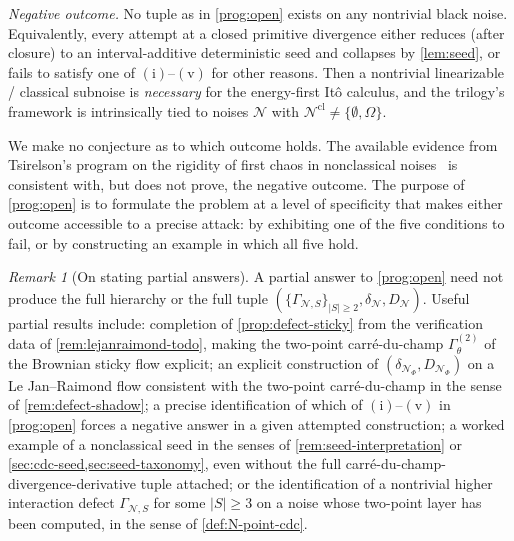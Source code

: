\documentclass[11pt,reqno]{amsart}
\theoremstyle{plain}
\theoremstyle{definition}
\theoremstyle{remark}
\newtheorem{remark}[theorem]{Remark}
\begin{document}
\medskip\noindent
\emph{Negative outcome.} No tuple as in \cref{prog:open} exists on
any nontrivial black noise. Equivalently, every attempt at a closed
primitive divergence either reduces (after closure) to an
interval-additive deterministic seed and collapses by
\cref{lem:seed}, or fails to satisfy one of
$(\mathrm i)$--$(\mathrm v)$ for other reasons. Then a nontrivial
linearizable / classical subnoise is \emph{necessary} for the
energy-first It\^o calculus, and the trilogy's framework is
intrinsically tied to noises $\mathcal N$ with
$\mathcal N^{\mathrm{cl}}\neq\{\emptyset,\Omega\}$.

\medskip
We make no conjecture as to which outcome holds. The available
evidence from Tsirelson's program on the rigidity of first chaos in
nonclassical noises~\cite{Tsirelson2004,TsirelsonVershik1998} is
consistent with, but does not prove, the negative outcome. The
purpose of \cref{prog:open} is to formulate the problem at a level
of specificity that makes either outcome accessible to a precise
attack: by exhibiting one of the five conditions to fail, or by
constructing an example in which all five hold.

\begin{remark}[On stating partial answers]\label{rem:partial-answers}
A partial answer to \cref{prog:open} need not produce the full
hierarchy or the full tuple
$(\{\Gamma_{\mathcal N,S}\}_{|S|\ge 2},\delta_{\mathcal N},D_{\mathcal N})$.
Useful partial results include: completion of
\cref{prop:defect-sticky} from the verification data of
\cref{rem:lejanraimond-todo}, making the two-point carr\'e-du-champ
$\Gamma^{(2)}_{\theta}$ of the Brownian sticky flow explicit; an
explicit construction of
$(\delta_{\mathcal N_{\Phi}},D_{\mathcal N_{\Phi}})$ on a
Le Jan--Raimond flow consistent with the two-point carr\'e-du-champ
in the sense of \cref{rem:defect-shadow}; a precise identification
of which of $(\mathrm i)$--$(\mathrm v)$ in \cref{prog:open} forces
a negative answer in a given attempted construction; a worked
example of a nonclassical seed in the senses of
\cref{rem:seed-interpretation} or
\cref{sec:cdc-seed,sec:seed-taxonomy}, even without the full
carr\'e-du-champ-divergence-derivative tuple attached; or the
identification of a nontrivial higher interaction defect
$\Gamma_{\mathcal N,S}$ for some $|S|\ge 3$ on a noise whose
two-point layer has been computed, in the sense of
\cref{def:N-point-cdc}.
\end{remark}

\end{document}
